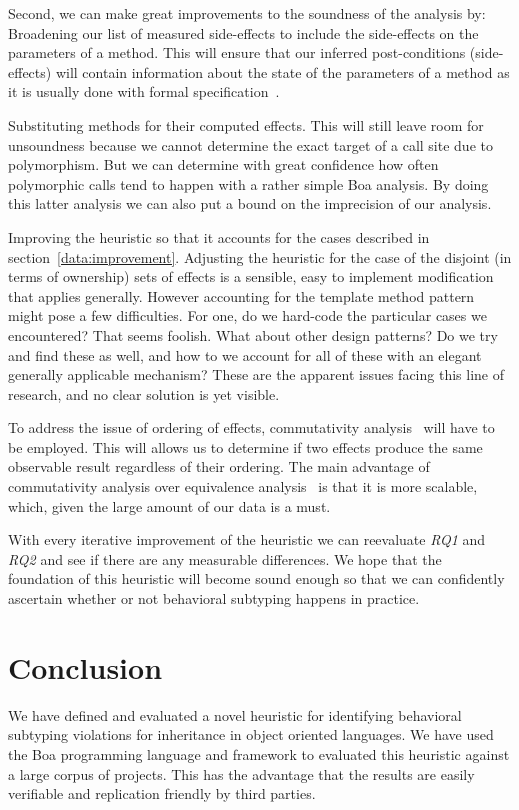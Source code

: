 \documentclass{acm_proc_article-sp}
\begin{document}
Second, we can make great improvements to the soundness of the analysis by:\\
Broadening our list of measured side-effects to include the side-effects on the parameters of a method. This will ensure that our inferred post-conditions (side-effects) will contain information about the state of the parameters of a method as it is usually done with formal specification~\cite{leavens2006design}.

Substituting methods for their computed effects. This will still leave room for unsoundness because we cannot determine the exact target of a call site due to polymorphism. But we can determine with great confidence how often polymorphic calls tend to happen with a rather simple Boa analysis. By doing this latter analysis we can also put a bound on the imprecision of our analysis.

Improving the heuristic so that it accounts for the cases described in section~\ref{data:improvement}. Adjusting the heuristic for the case of the disjoint (in terms of ownership) sets of effects is a sensible, easy to implement modification that applies generally. However accounting for the template method pattern might pose a few difficulties. For one, do we hard-code the particular cases we encountered? That seems foolish. What about other design patterns? Do we try and find these as well, and how to we account for all of these with an elegant generally applicable mechanism? These are the apparent issues facing this line of research, and no clear solution is yet visible.

To address the issue of ordering of effects, commutativity analysis~\cite{rinard1997commutativity, aleen2009commutativity} will have to be employed. This will allows us to determine if two effects produce the same observable result regardless of their ordering. The main advantage of commutativity analysis over equivalence analysis~\cite{menon2003fractal} is that it is more scalable, which, given the large amount of our data is a must.

With every iterative improvement of the heuristic we can reevaluate \emph{RQ1} and \emph{RQ2} and see if there are any measurable differences. We hope that the foundation of this heuristic will become sound enough so that we can confidently ascertain whether or not behavioral subtyping happens in practice.

\section{Conclusion}
We have defined and evaluated a novel heuristic for identifying behavioral subtyping violations for inheritance in object oriented languages. We have used the Boa programming language and framework to evaluated this heuristic against a large corpus of projects. This has the advantage that the results are easily verifiable and replication friendly by third parties.
\end{document}
